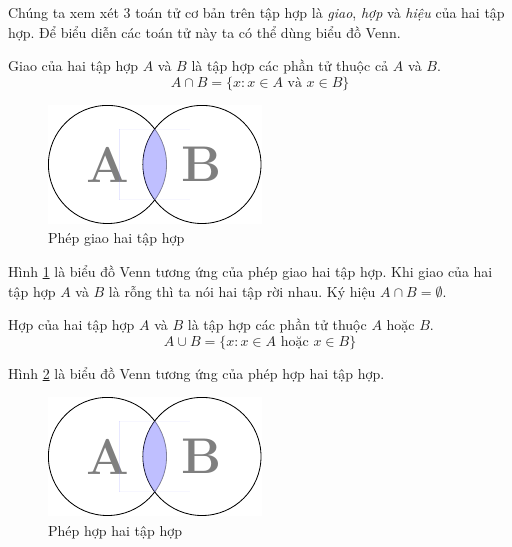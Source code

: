 Chúng ta xem xét 3 toán tử cơ bản trên tập hợp là \textit{giao}, \textit{hợp}
và \textit{hiệu} của hai tập hợp. Để biểu diễn các toán tử này ta có thể dùng 
biểu đồ Venn.

\begin{definition}
    Giao của hai tập hợp $A$ và $B$ là tập hợp các phần tử thuộc cả $A$ và $B$.
    \begin{equation}
        A \cap B = \{ x : x \in A \text{ và } x \in B \}
    \end{equation}
\end{definition}

\begin{figure}[htb]
    \centering
    \includegraphics[page=1]{figures/set/venn_diagram.pdf}
    \caption{Phép giao hai tập hợp}
    \label{set1}
\end{figure}

Hình \ref{set1} là biểu đồ Venn tương ứng của phép giao hai tập hợp. Khi giao của hai 
tập hợp $A$ và $B$ là rỗng thì ta nói hai tập rời nhau. Ký hiệu $A \cap B = \emptyset$.

\begin{definition}
    Hợp của hai tập hợp $A$ và $B$ là tập hợp các phần tử thuộc $A$ hoặc $B$.
    \begin{equation}
        A \cup B = \{ x : x \in A \text{ hoặc } x \in B \}
    \end{equation}
\end{definition}

Hình \ref{set2} là biểu đồ Venn tương ứng của phép hợp hai tập hợp.

\begin{figure}[htb]
    \centering
    \includegraphics[page=2]{figures/set/venn_diagram.pdf}
    \caption{Phép hợp hai tập hợp}
    \label{set2}
\end{figure}

